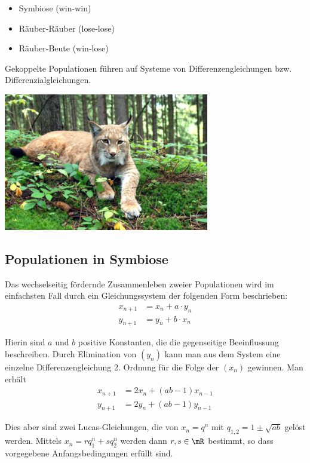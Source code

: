 \documentclass[%
<<<<<<< Updated upstream
11pt,%
twoside,%
titlepage,%
german,%
headsepline%
]{scrartcl}
\begin{document}
\begin{itemize}
\item Symbiose (win-win)
\item Räuber-Räuber (lose-lose)
\item Räuber-Beute (win-lose)
\end{itemize}

Gekoppelte Populationen führen auf Systeme von Differenzengleichungen bzw. Differenzialgleichungen.

\begin{center}
\includegraphics[height=6cm]{pictures/luchs.jpg}
\end{center}

\subsection{Populationen in Symbiose}
Das wechselseitig fördernde Zusammenleben zweier Populationen wird im einfachsten Fall durch ein Gleichungssystem der folgenden Form beschrieben:
\begin{align*}
x_{n+1} &= x_n+a\cdot y_n\\
y_{n+1} &= y_n+b\cdot x_n
\end{align*}

Hierin sind $a$ und $b$ positive Konstanten, die die gegenseitige Beeinflussung beschreiben. Durch Elimination von $(y_n)$ kann man aus dem System eine einzelne Differenzengleichung 2. Ordnung für die Folge der $(x_n)$ gewinnen. Man erhält
\begin{align*}
x_{n+1} &= 2x_n+(ab-1)x_{n-1}\\
y_{n+1} &= 2y_n+(ab-1)y_{n-1}
\end{align*}

Dies aber sind zwei Lucas-Gleichungen, die von $x_n = q^n$ mit $q_{1,2} = 1\pm\sqrt{ab}$ gelöst werden. Mittels $x_n=rq_1^n+sq_2^n$ werden dann $r,s\in\mR$ bestimmt, so dass vorgegebene Anfangsbedingungen erfüllt sind.
\end{document}

